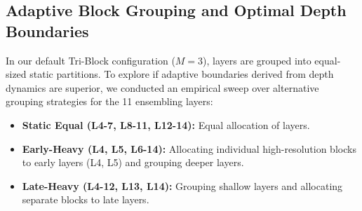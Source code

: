 \subsection{Adaptive Block Grouping and Optimal Depth Boundaries}
In our default Tri-Block configuration ($M=3$), layers are grouped into equal-sized static partitions. To explore if adaptive boundaries derived from depth dynamics are superior, we conducted an empirical sweep over alternative grouping strategies for the 11 ensembling layers:
\begin{itemize}
    \item \textbf{Static Equal (L4-7, L8-11, L12-14):} Equal allocation of layers.
    \item \textbf{Early-Heavy (L4, L5, L6-14):} Allocating individual high-resolution blocks to early layers (L4, L5) and grouping deeper layers.
    \item \textbf{Late-Heavy (L4-12, L13, L14):} Grouping shallow layers and allocating separate blocks to late layers.
\end{itemize}
